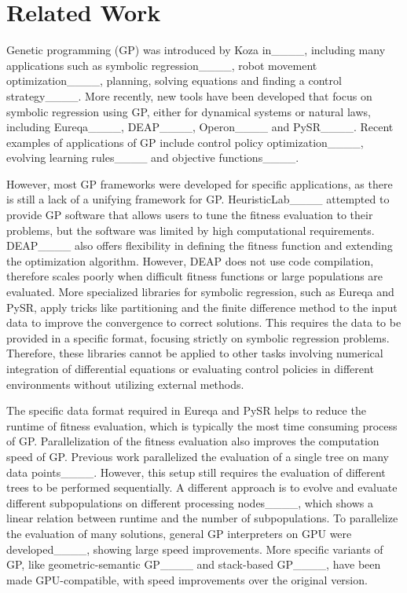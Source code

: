 \section{Related Work}
Genetic programming (GP) was introduced by Koza in____, including many applications such as symbolic regression____, robot movement optimization____, planning, solving equations and finding a control strategy____. More recently, new tools have been developed that focus on symbolic regression using GP, either for dynamical systems or natural laws, including Eureqa____, DEAP____, Operon____ and PySR____. Recent examples of applications of GP include control policy optimization____, evolving learning rules____ and objective functions____.

However, most GP frameworks were developed for specific applications, as there is still a lack of a unifying framework for GP. HeuristicLab____ attempted to provide GP software that allows users to tune the fitness evaluation to their problems, but the software was limited by high computational requirements. DEAP____ also offers flexibility in defining the fitness function and extending the optimization algorithm. However, DEAP does not use code compilation, therefore scales poorly when difficult fitness functions or large populations are evaluated. More specialized libraries for symbolic regression, such as Eureqa and PySR, apply tricks like partitioning and the finite difference method to the input data to improve the convergence to correct solutions. This requires the data to be provided in a specific format, focusing strictly on symbolic regression problems. Therefore, these libraries cannot be applied to other tasks involving numerical integration of differential equations or evaluating control policies in different environments without utilizing external methods. 

The specific data format required in Eureqa and PySR helps to reduce the runtime of fitness evaluation, which is typically the most time consuming process of GP. Parallelization of the fitness evaluation also improves the computation speed of GP. Previous work parallelized the evaluation of a single tree on many data points____. However, this setup still requires the evaluation of different trees to be performed sequentially. A different approach is to evolve and evaluate different subpopulations on different processing nodes____, which shows a linear relation between runtime and the number of subpopulations. To parallelize the evaluation of many solutions, general GP interpreters on GPU were developed____, showing large speed improvements. More specific variants of GP, like geometric-semantic GP____ and stack-based GP____, have been made GPU-compatible, with speed improvements over the original version. 

